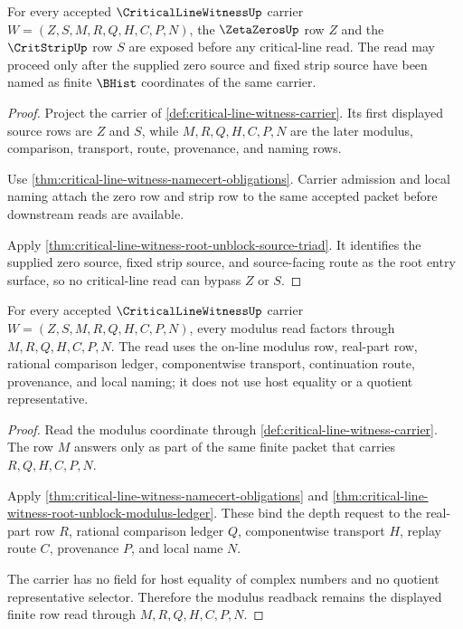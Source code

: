 \begin{theorem}
\label{thm:critical-line-witness-zero-strip-source-row}
For every accepted $\CriticalLineWitnessUp$ carrier $W=(Z,S,M,R,Q,H,C,P,N)$, the $\ZetaZerosUp$ row $Z$ and the $\CritStripUp$ row $S$ are exposed before any critical-line read. The read may proceed only after the supplied zero source and fixed strip source have been named as finite $\BHist$ coordinates of the same carrier.
\end{theorem}
\begin{proof}
Project the carrier of \autoref{def:critical-line-witness-carrier}. Its first displayed source rows are $Z$ and $S$, while $M,R,Q,H,C,P,N$ are the later modulus, comparison, transport, route, provenance, and naming rows.

Use \autoref{thm:critical-line-witness-namecert-obligations}. Carrier admission and local naming attach the zero row and strip row to the same accepted packet before downstream reads are available.

Apply \autoref{thm:critical-line-witness-root-unblock-source-triad}. It identifies the supplied zero source, fixed strip source, and source-facing route as the root entry surface, so no critical-line read can bypass $Z$ or $S$.
\end{proof}

\begin{theorem}
\label{thm:critical-line-witness-modulus-readback-row}
For every accepted $\CriticalLineWitnessUp$ carrier $W=(Z,S,M,R,Q,H,C,P,N)$, every modulus read factors through $M,R,Q,H,C,P,N$. The read uses the on-line modulus row, real-part row, rational comparison ledger, componentwise transport, continuation route, provenance, and local naming; it does not use host equality or a quotient representative.
\end{theorem}
\begin{proof}
Read the modulus coordinate through \autoref{def:critical-line-witness-carrier}. The row $M$ answers only as part of the same finite packet that carries $R,Q,H,C,P,N$.

Apply \autoref{thm:critical-line-witness-namecert-obligations} and \autoref{thm:critical-line-witness-root-unblock-modulus-ledger}. These bind the depth request to the real-part row $R$, rational comparison ledger $Q$, componentwise transport $H$, replay route $C$, provenance $P$, and local name $N$.

The carrier has no field for host equality of complex numbers and no quotient representative selector. Therefore the modulus readback remains the displayed finite row read through $M,R,Q,H,C,P,N$.
\end{proof}

